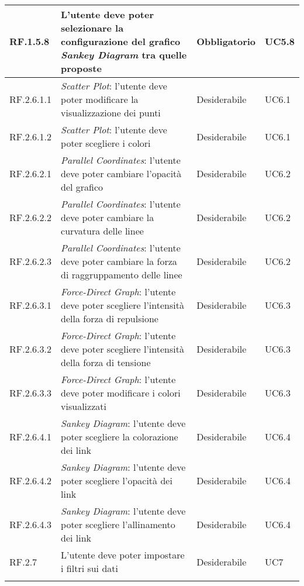 \begin{center}
\begin{longtable}{|L{2cm}|C{5,5cm}|C{3cm}|C{2cm}|}
    RF.1.5.8 & L'utente deve poter selezionare la configurazione del grafico \textit{Sankey Diagram} tra quelle proposte& Obbligatorio & UC5.8 \\ \hline
    RF.2.6.1.1 & \textit{Scatter Plot}: l'utente deve poter modificare la visualizzazione dei punti & Desiderabile & UC6.1 \\ \hline
    RF.2.6.1.2 & \textit{Scatter Plot}: l'utente deve poter scegliere i colori  & Desiderabile & UC6.1 \\ \hline
    RF.2.6.2.1 & \textit{Parallel Coordinates}: l'utente deve poter cambiare l'opacità del grafico & Desiderabile & UC6.2 \\ \hline
    RF.2.6.2.2 & \textit{Parallel Coordinates}: l'utente deve poter cambiare la curvatura delle linee & Desiderabile & UC6.2 \\ \hline
    RF.2.6.2.3 & \textit{Parallel Coordinates}: l'utente deve poter cambiare la forza di raggruppamento delle linee & Desiderabile & UC6.2 \\ \hline
    RF.2.6.3.1 & \textit{Force-Direct Graph}: l'utente deve poter scegliere l'intensità della forza di repulsione & Desiderabile & UC6.3 \\ \hline
    RF.2.6.3.2 & \textit{Force-Direct Graph}: l'utente deve poter scegliere l'intensità della forza di tensione & Desiderabile & UC6.3 \\ \hline
    RF.2.6.3.3 & \textit{Force-Direct Graph}: l'utente deve poter modificare i colori visualizzati & Desiderabile & UC6.3 \\ \hline
    RF.2.6.4.1 & \textit{Sankey Diagram}: l'utente deve poter scegliere la colorazione dei link & Desiderabile & UC6.4 \\ \hline
    RF.2.6.4.2 & \textit{Sankey Diagram}: l'utente deve poter scegliere l'opacità dei link & Desiderabile & UC6.4 \\ \hline
    RF.2.6.4.3 & \textit{Sankey Diagram}: l'utente deve poter scegliere l'allinamento dei link & Desiderabile & UC6.4 \\ \hline
    RF.2.7 & L'utente deve poter impostare i filtri sui dati & Desiderabile & UC7 \\ \hline

\end{longtable}
\end{center}
